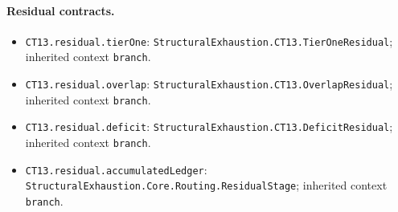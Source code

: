 \paragraph{Residual contracts.}
\begin{itemize}
\item \texttt{CT13.\allowbreak{}residual.\allowbreak{}tier\allowbreak{}One}: \texttt{Structural\allowbreak{}Exhaustion.\allowbreak{}CT13.\allowbreak{}Tier\allowbreak{}One\allowbreak{}Residual}; inherited context \texttt{branch}.
\item \texttt{CT13.\allowbreak{}residual.\allowbreak{}overlap}: \texttt{Structural\allowbreak{}Exhaustion.\allowbreak{}CT13.\allowbreak{}Overlap\allowbreak{}Residual}; inherited context \texttt{branch}.
\item \texttt{CT13.\allowbreak{}residual.\allowbreak{}deficit}: \texttt{Structural\allowbreak{}Exhaustion.\allowbreak{}CT13.\allowbreak{}Deficit\allowbreak{}Residual}; inherited context \texttt{branch}.
\item \texttt{CT13.\allowbreak{}residual.\allowbreak{}accumulated\allowbreak{}Ledger}: \texttt{Structural\allowbreak{}Exhaustion.\allowbreak{}Core.\allowbreak{}Routing.\allowbreak{}Residual\allowbreak{}Stage}; inherited context \texttt{branch}.
\end{itemize}
\endgroup
